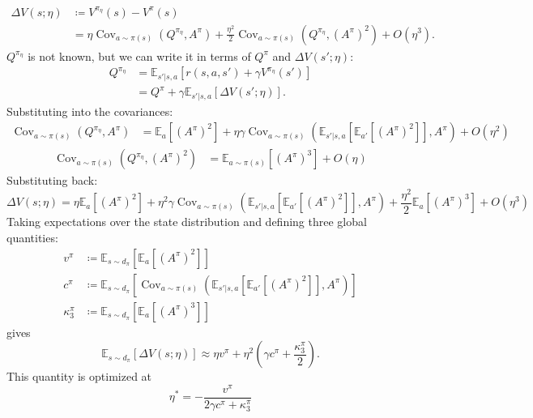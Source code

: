 \documentclass{article}
\theoremstyle{plain}
\theoremstyle{definition}
\theoremstyle{remark}
\newcommand{\E}{\mathbb{E}}
\DeclareMathOperator{\Cov}{Cov}
\begin{document}
\begin{align}
  \Delta V(s;\eta)
  &\coloneqq V^{\pi_\eta}(s) - V^\pi(s) \nonumber\\
  &= \eta\Cov_{a\sim\pi(s)}(Q^{\pi_\eta},A^\pi) + \frac{\eta^2}{2}\Cov_{a\sim\pi(s)}(Q^{\pi_\eta},(A^\pi)^2) + O(\eta^3).
\end{align}
$Q^{\pi_\eta}$ is not known, but we can write it in terms of $Q^\pi$ and $\Delta V(s';\eta)$:
\begin{align}
  Q^{\pi_\eta}
  &= \E_{s'|s,a}[r(s,a,s') + \gamma V^{\pi_\eta}(s')]\nonumber\\
  &= Q^\pi + \gamma \E_{s'|s,a}[\Delta V(s';\eta)].
\end{align}
Substituting into the covariances:
\begin{align}
    \Cov_{a\sim\pi(s)}(Q^{\pi_\eta},A^\pi)
    &= \E_a[(A^\pi)^2] + \eta\gamma\Cov_{a\sim\pi(s)}(\E_{s'|s,a}[\E_{a'}[(A^\pi)^2]],A^\pi) + O(\eta^2)
\end{align}
\begin{align}
    \Cov_{a\sim\pi(s)}(Q^{\pi_\eta},(A^\pi)^2)
    &= \E_{a\sim\pi(s)}[(A^\pi)^3] + O(\eta)
\end{align}
Substituting back:
\begin{equation}
  \Delta V(s;\eta) = \eta\E_a[(A^\pi)^2] + \eta^2\gamma\Cov_{a\sim\pi(s)}(\E_{s'|s,a}[\E_{a'}[(A^\pi)^2]],A^\pi) + \frac{\eta^2}{2}\E_a[(A^\pi)^3] + O(\eta^3)
\end{equation}
Taking expectations over the state distribution and defining three global quantities:
\begin{align}
    v^\pi &\coloneqq \E_{s\sim d_\pi}[\E_a[(A^\pi)^2]]\nonumber\\
    c^\pi &\coloneqq \E_{s\sim d_\pi}[\Cov_{a\sim\pi(s)}(\E_{s'|s,a}[\E_{a'}[(A^\pi)^2]],A^\pi)]\nonumber\\
    \kappa_3^\pi &\coloneqq \E_{s\sim d_\pi}[\E_a[(A^\pi)^3]]\nonumber
\end{align}
gives
\begin{equation}
  \E_{s\sim d_\pi}[\Delta V(s;\eta)] \approx \eta v^\pi + \eta^2\left(\gamma c^\pi + \frac{\kappa_3^\pi}{2}\right).
\end{equation}
This quantity is optimized at
\begin{equation}\label{eq:app-eta-star}
  \boxed{\;\eta^* = -\frac{v^\pi}{2\gamma c^\pi + \kappa_3^\pi}\;}
\end{equation}
\end{document}
